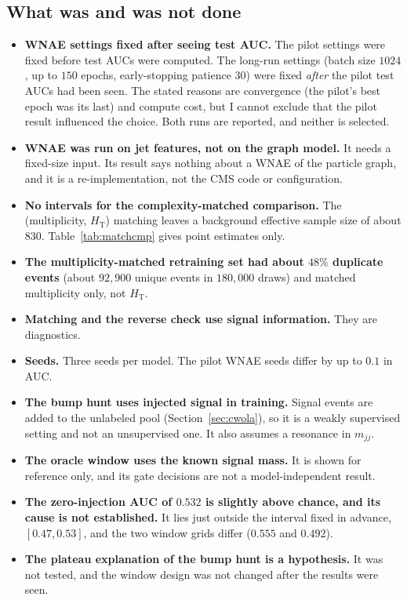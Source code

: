 \documentclass[11pt,a4paper]{article}
\newcommand{\HT}{\ensuremath{H_\mathrm{T}}\xspace}
\newcommand{\mjj}{\ensuremath{m_{jj}}\xspace}
\begin{document}
\subsection{What was and was not done}
\label{sec:disclosures}

\begin{itemize}
  \item \textbf{WNAE settings fixed after seeing test AUC.} The pilot settings were fixed before
        test AUCs were computed. The long-run settings (batch size $1024$, up to $150$ epochs, early-stopping
        patience $30$) were fixed \emph{after} the pilot test AUCs had been seen. The stated reasons are
        convergence (the pilot's best epoch was its last) and compute cost, but I cannot exclude that
        the pilot result influenced the choice. Both runs are reported, and neither is selected.
  \item \textbf{WNAE was run on jet features, not on the graph model.} It needs a fixed-size input.
        Its result says nothing about a WNAE of the particle graph, and it is a re-implementation, not the
        CMS code or configuration.
  \item \textbf{No intervals for the complexity-matched comparison.} The (multiplicity, \HT)
        matching leaves a background effective sample size of about $830$. Table~\ref{tab:matchcmp}
        gives point estimates only.
  \item \textbf{The multiplicity-matched retraining set had about $48\%$ duplicate events} (about
        $92{,}900$ unique events in $180{,}000$ draws) and matched multiplicity only, not \HT.
  \item \textbf{Matching and the reverse check use signal information.} They are diagnostics.
  \item \textbf{Seeds.} Three seeds per model. The pilot WNAE seeds differ by up to $0.1$ in AUC.
  \item \textbf{The bump hunt uses injected signal in training.} Signal events are added to the unlabeled
        pool (Section~\ref{sec:cwola}), so it is a weakly supervised setting and not an unsupervised one. It
        also assumes a resonance in \mjj.
  \item \textbf{The oracle window uses the known signal mass.} It is shown for reference only, and its gate
        decisions are not a model-independent result.
  \item \textbf{The zero-injection AUC of $0.532$ is slightly above chance, and its cause is not established.}
        It lies just outside the interval fixed in advance, $[0.47,0.53]$, and the two window grids
        differ ($0.555$ and $0.492$).
  \item \textbf{The plateau explanation of the bump hunt is a hypothesis.} It was not tested, and the window design
        was not changed after the results were seen.
\end{itemize}
\end{document}
